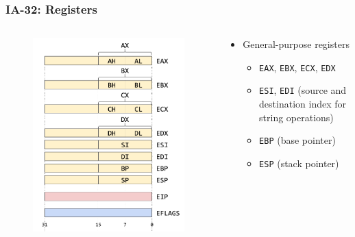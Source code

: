 \documentclass[]{beamer}
\begin{document}
\begin{frame}
	\frametitle{IA-32: Registers}
	\begin{columns}
		\begin{column}{2in}
			\begin{figure}
				\centering
				\includegraphics[width=\textwidth]{images/x86-isa}
			\end{figure}
		\end{column}
		\begin{column}{2.7in}
	      	\begin{itemize}
	      		\item General-purpose registers
	      		\begin{itemize}
	      			\item {\tt EAX}, {\tt EBX}, {\tt ECX}, {\tt EDX}
	      			\item {\tt ESI}, {\tt EDI} (source and destination index for string operations)
	      			\item {\tt EBP} (base pointer)
	      			\item {\tt ESP} (stack pointer)

\end{itemize}
\end{itemize}
\end{column}
\end{columns}
\end{frame}
\end{document}
